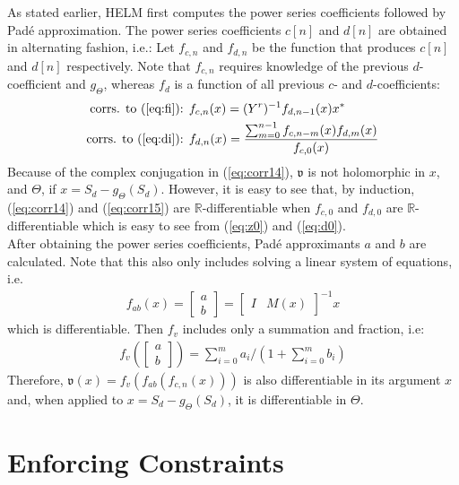 As stated earlier, HELM first computes the power series coefficients followed by Pad\'e approximation. The power series coefficients $c[n]$ and $d[n]$ are obtained in alternating fashion, i.e.: Let $f_{c,n}$ and $f_{d,n}$ be the function that produces $c[n]$ and $d[n]$ respectively. Note that $f_{c,n}$ requires knowledge of the previous $d$-coefficient and $g_\Theta$, whereas $f_d$ is a function of all previous $c$- and $d$-coefficients:
\begin{align}
\text{corrs. to (\ref{eq:fi}): } & f_{c,n}(x)  = (Y^r)^{-1}f_{d,n-1}(x)x^* \label{eq:corr14}\\
\text{corrs. to (\ref{eq:di}): } & f_{d,n}(x)  = \frac{\sum_{m=0}^{n-1} f_{c,n-m}(x)f_{d,m}(x)}{f_{c,0}(x)} \label{eq:corr15}
\end{align}
Because of the complex conjugation in (\ref{eq:corr14}), $\mathfrak{v}$ is not holomorphic in $x$, and $\Theta$, if $x = S_d-g_\Theta(S_d)$. However, it is easy to see that, by induction, (\ref{eq:corr14}) and (\ref{eq:corr15}) are $\mathbb{R}$-differentiable when $f_{c,0}$ and $f_{d,0}$ are $\mathbb{R}$-differentiable which is easy to see from (\ref{eq:z0}) and (\ref{eq:d0}).\\
After obtaining the power series coefficients, Pad\'e approximants $a$ and $b$ are calculated. Note that this also only includes solving a linear system of equations, i.e. \begin{align*}
f_{ab}(x) = \begin{bmatrix}a\\ b\end{bmatrix} = \begin{bmatrix}I & M(x)\end{bmatrix}^{-1}  x
\end{align*} which is differentiable. Then $f_v$ includes only a summation and fraction, i.e:
\begin{align*}
f_v(\begin{bmatrix}a\\ b\end{bmatrix}) = \sum_{i=0}^m a_i / (1+\sum_{i=0}^m b_i)
\end{align*}
Therefore, $\mathfrak{v}(x) = f_v(f_{ab}(f_{c,n}(x)))$ is also differentiable in its argument $x$ and, when applied to $x = S_d-g_\Theta(S_d)$, it is differentiable in $\Theta$.

\section{Enforcing Constraints}
\label{sec:constraints}
